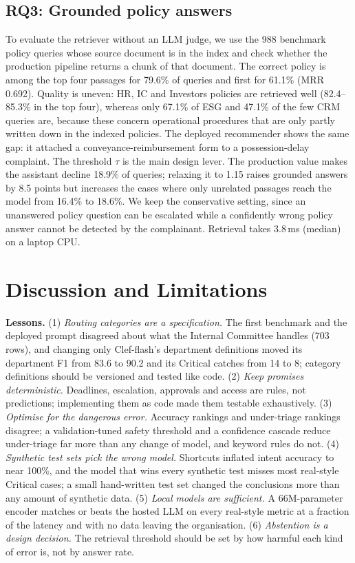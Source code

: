 \documentclass[conference]{IEEEtran}
\begin{document}
\subsection{RQ3: Grounded policy answers}
To evaluate the retriever without an LLM judge, we use the 988 benchmark policy queries whose
source document is in the index and check whether the production pipeline returns a chunk of that document.
The correct policy is among the top four passages for 79.6\% of queries and first for 61.1\% (MRR 0.692). Quality
is uneven: HR, IC and Investors policies are retrieved well (82.4--85.3\% in the top four), whereas only 67.1\% of
ESG and 47.1\% of the few CRM queries are, because these concern operational procedures that are only partly
written down in the indexed policies. The deployed recommender shows the same gap: it attached a
conveyance-reimbursement form to a possession-delay complaint. The threshold $\tau$ is the main design lever. The
production value makes the assistant decline 18.9\% of queries; relaxing it to 1.15 raises grounded answers by 8.5
points but increases the cases where only unrelated passages reach the model from 16.4\% to 18.6\%. We keep the
conservative setting, since an unanswered policy question can be escalated while a confidently wrong policy answer
cannot be detected by the complainant. Retrieval takes 3.8\,ms (median) on a laptop CPU.

\section{Discussion and Limitations}

\textbf{Lessons.} (1) \emph{Routing categories are a specification.} The first benchmark and the deployed prompt
disagreed about what the Internal Committee handles (703 rows), and changing only Clef-flash's department
definitions moved its department F1 from 83.6 to 90.2 and its Critical catches from 14 to 8; category definitions
should be versioned and tested like code. (2) \emph{Keep promises deterministic.}
Deadlines, escalation, approvals and access are rules, not predictions; implementing them as code made them
testable exhaustively. (3) \emph{Optimise for the dangerous error.} Accuracy rankings and under-triage rankings
disagree; a validation-tuned safety threshold and a confidence cascade reduce under-triage far more than any change
of model, and keyword rules do not. (4) \emph{Synthetic test sets pick the wrong model.} Shortcuts inflated intent
accuracy to near 100\%, and the model that wins every synthetic test misses most real-style Critical cases; a small
hand-written test set changed the conclusions more than any amount of synthetic data. (5) \emph{Local models are
sufficient.} A 66M-parameter encoder matches or beats the hosted LLM on every real-style metric at a fraction of the
latency and with no data leaving the organisation. (6) \emph{Abstention is a design decision.} The retrieval
threshold should be set by how harmful each kind of error is, not by answer rate.
\end{document}
